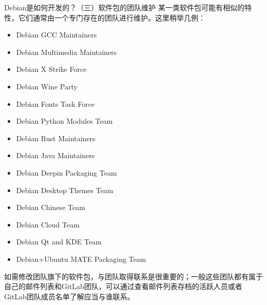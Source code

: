 \begin{frame}{Debian是如何开发的？（三）}{软件包的团队维护}
	某一类软件包可能有相似的特性，它们通常由一个专门存在的团队进行维护。这里稍举几例：
	
	\vfill
	
	\begin{multicols}{2}
		\begin{itemize}
		    \item Debian GCC Maintainers
		    \item Debian Multimedia Maintainers
		    \item Debian X Strike Force
	    	\item Debian Wine Party
		    \item Debian Fonts Task Force
		    \item Debian Python Modules Team
		    \item Debian Rust Maintainers
	    \end{itemize}
    	\columnbreak
    	\begin{itemize}
    		\item Debian Java Maintainers
    		\item Debian Deepin Packaging Team
    		\item Debian Desktop Themes Team
    		\item Debian Chinese Team
    		\item Debian Cloud Team
    		\item Debian Qt and KDE Team
    		\item Debian+Ubuntu MATE Packaging Team
    	\end{itemize}
    \end{multicols}
    

    如需修改团队旗下的软件包，与团队取得联系是很重要的；一般这些团队都有属于自己的邮件列表和GitLab团队，可以通过查看邮件列表存档的活跃人员或者GitLab团队成员名单了解应当与谁联系。
\end{frame}